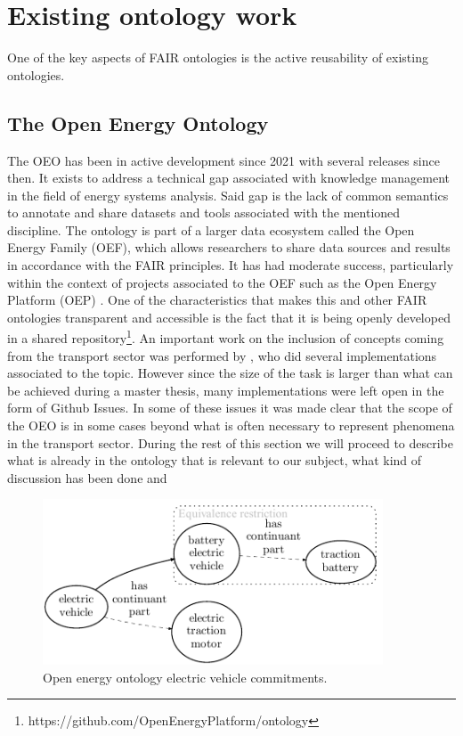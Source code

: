 
\section{Existing ontology work}
\label{existingontologies}

One of the key aspects of FAIR ontologies is the active reusability of existing
ontologies.

\subsection{The Open Energy Ontology}

The OEO has been in active development since 2021 with several releases since
then. It exists to address a technical gap associated with knowledge management
in the field of energy systems analysis. Said gap is the lack of common
semantics to annotate and share datasets and tools associated with the
mentioned discipline. The ontology is part of a larger data ecosystem called
the Open Energy Family (OEF), which allows researchers to share data sources
and results in accordance with the FAIR principles. It has had moderate
success, particularly within the context of projects associated to the OEF such
as the Open Energy Platform (OEP) \cite{Hulk.2024}. One of the characteristics
that makes this and other FAIR ontologies transparent and accessible is the
fact that it is being openly developed in a shared
repository\footnote{https://github.com/OpenEnergyPlatform/ontology}. An
important work on the inclusion of concepts coming from the transport sector
was performed by \cite{Mittermeier.2023}, who did several implementations
associated to the topic. However since the size of the task is larger than what
can be achieved during a master thesis, many implementations were left open in
the form of Github Issues. In some of these issues it was made clear that the
scope of the OEO is in some cases beyond what is often necessary to represent
phenomena in the transport sector. During the rest of this section we will
proceed to describe what is already in the ontology that is relevant to our
subject, what kind of discussion has been done and


\begin{figure}[h]
    \caption{Open energy ontology electric vehicle commitments.}
    \centering
    \includegraphics[width=0.9\textwidth]{images/OEOEV}
\end{figure}

